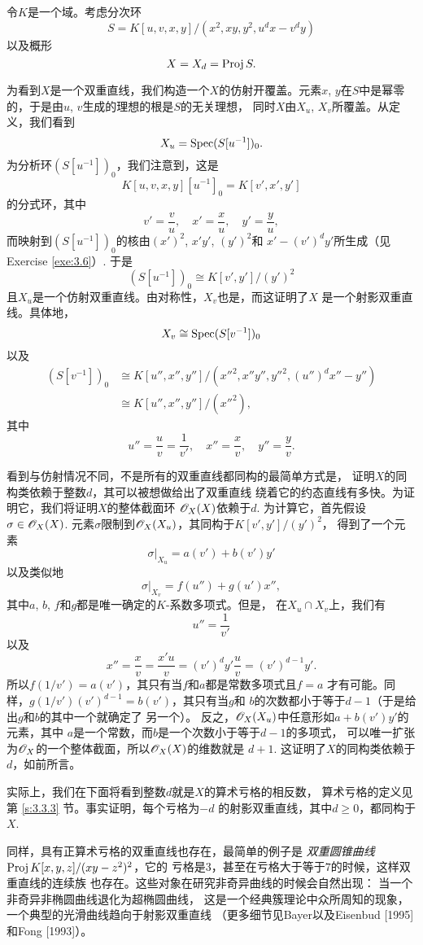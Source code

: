 令$K$是一个域。考虑分次环
\[
	S=K[u,v,x,y]/(x^2,xy,y^2,u^dx-v^dy)
\]
以及概形
\[
	X=X_d=\operatorname{Proj} S.
\]

为看到$X$是一个双重直线，我们构造一个$X$的仿射开覆盖。元素$x$,
$y$在$S$中是幂零的，于是由$u$, $v$生成的理想的根是$S$的无关理想，
同时$X$由$X_u$, $X_v$所覆盖。从定义，我们看到
\[
	X_u=\operatorname{Spec} (S[u^{-1}])_0.
\]%
为分析环$(S[u^{-1}])_0$，我们注意到，这是
\[
	K[u,v,x,y][u^{-1}]_0=K[v',x',y']
\]
的分式环，其中
\[
	v'=\frac vu,\quad x'=\frac xu,\quad y'=\frac yu,
\]
而映射到$(S[u^{-1}])_0$的核由$(x')^2$, $x'y'$, $(y')^2$和
$x'-(v')^dy'$所生成（见Exercise \ref{exe:3.6}）. 于是
\[
	(S[u^{-1}])_0\cong K[v',y']/(y')^2
\]
且$X_u$是一个仿射双重直线。由对称性，$X_v$也是，而这证明了$X$
是一个射影双重直线。具体地，
\[
	X_v\cong \operatorname{Spec} (S[v^{-1}])_0
\]
以及
\begin{align*}
(S[v^{-1}])_0{}&\cong K[u'',x'',y'']/({x''}^2,x''y'',{y''}^2,
(u'')^dx''-y'')\\
{}&\cong K[u'',x'',y'']/({x''}^2),
\end{align*}
其中
\[
	u''=\frac uv=\frac 1{v'},\quad x''=\frac xv,\quad 
	y''=\frac yv.
\]

看到与仿射情况不同，不是所有的双重直线都同构的最简单方式是，
证明$X$的同构类依赖于整数$d$，其可以被想做给出了双重直线
绕着它的约态直线有多快。为证明它，我们将证明$X$的整体截面环
$\mathscr{O}_X(X)$依赖于$d$. 为计算它，首先假设$\sigma\in \mathscr{O}_X(X)$.
元素$\sigma$限制到$\mathscr{O}_X(X_u)$，其同构于$K[v',y']/(y')^2$，
得到了一个元素
\[
	\sigma|_{X_u}=a(v')+b(v')y'
\]
以及类似地
\[
	\sigma|_{X_v}=f(u'')+g(u')x'',
\]
其中$a$, $b$, $f$和$g$都是唯一确定的$K$-系数多项式。但是，
在$X_u\cap X_v$上，我们有
\[
	u''=\frac 1{v'}
\]
以及
\[
	x''=\frac xv=\frac{x'u}v=(v')^d y'\frac uv=(v')^{d-1}y'.
\]
所以$f(1/v')=a(v')$，其只有当$f$和$a$都是常数多项式且$f=a$
才有可能。同样，$g(1/v')(v')^{d-1}=b(v')$，其只有当$g$和
$b$的次数都小于等于$d-1$（于是给出$g$和$b$的其中一个就确定了
另一个）。%
反之，$\mathscr{O}_X(X_u)$中任意形如$a+b(v')y'$的元素，其中
$a$是一个常数，而$b$是一个次数小于等于$d-1$的多项式，
可以唯一扩张为$\mathscr{O}_X$的一个整体截面，所以$\mathscr{O}_X(X)$的维数就是
$d+1$. 这证明了$X$的同构类依赖于$d$，如前所言。

实际上，我们在下面将看到整数$d$就是$X$的算术亏格的相反数，
算术亏格的定义见第 \ref{s:3.3.3} 节。事实证明，每个亏格为$-d$
的射影双重直线，其中$d\geq 0$，都同构于$X$.

同样，具有正算术亏格的双重直线也存在，最简单的例子是
\textit{双重圆锥曲线} $\operatorname{Proj} K[x,y,z]/(xy-z^2)^2$，它的
亏格是$3$，甚至在亏格大于等于$7$的时候，这样双重直线的连续族
也存在。这些对象在研究非奇异曲线的时候会自然出现：
当一个非奇异非椭圆曲线退化为超椭圆曲线，
这是一个经典簇理论中众所周知的现象，
一个典型的光滑曲线趋向于射影双重直线
（更多细节见Bayer以及Eisenbud [1995]和Fong [1993]）。

